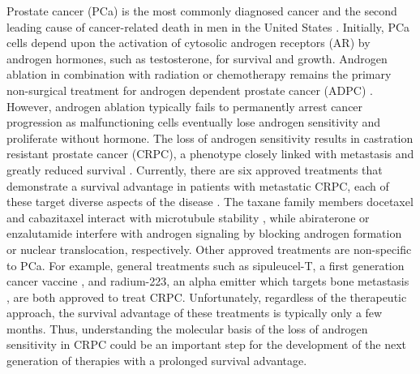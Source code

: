 \documentclass[12pt]{article}
\begin{document}
Prostate cancer (PCa) is the most commonly diagnosed cancer and the second leading cause of cancer-related death in men in the United States \cite{Siegel2013}. 
Initially, PCa cells depend upon the activation of cytosolic androgen receptors (AR) by androgen hormones, such as testosterone, for survival and growth. 
Androgen ablation in combination with radiation or chemotherapy remains the primary non-surgical treatment for androgen dependent prostate cancer (ADPC) \cite{Huggins1967}. 
However, androgen ablation typically fails to permanently arrest cancer progression as malfunctioning cells eventually lose androgen sensitivity and proliferate without hormone. 
The loss of androgen sensitivity results in castration resistant prostate cancer (CRPC), a phenotype closely linked with metastasis and greatly reduced survival \cite{Harris2009}.
Currently, there are six approved treatments that demonstrate a survival advantage in patients with metastatic CRPC, each of these target diverse aspects of the disease \cite{Sartor2013}.
The taxane family members docetaxel and cabazitaxel interact with microtubule stability \cite{Tannock2004,Bono2010}, while abiraterone \cite{Sartor2013} or enzalutamide \cite{Scher2012} interfere with androgen signaling by blocking androgen formation or nuclear translocation, respectively.
Other approved treatments are non-specific to PCa. 
For example, general treatments such as sipuleucel-T, a first generation cancer vaccine \cite{Kantoff2010}, 
and radium-223, an alpha emitter which targets bone metastasis \cite{Parker2013}, are both approved to treat CRPC.
Unfortunately, regardless of the therapeutic approach, the survival advantage of these treatments is typically only a few months. 
Thus, understanding the molecular basis of the loss of androgen sensitivity in CRPC could be an important step for the development of the next generation of therapies with a prolonged survival
advantage.   
\end{document}
